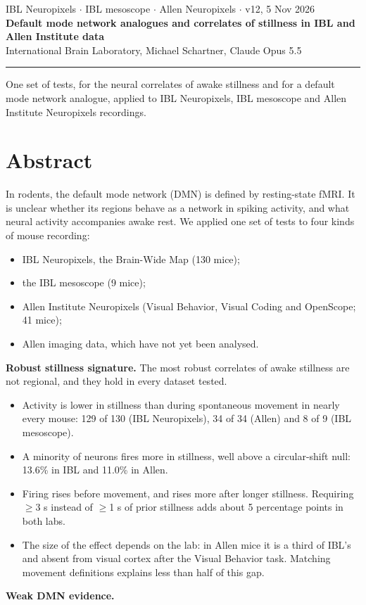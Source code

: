 \documentclass[10pt,a4paper]{article}
\begin{document}
{\small\color{muted} IBL Neuropixels $\cdot$ IBL mesoscope $\cdot$ Allen Neuropixels $\cdot$ v12, 5 Nov 2026}\\[4pt]
{\LARGE\bfseries Default mode network analogues and correlates of stillness in IBL and Allen Institute data}\\[4pt]
{\normalsize International Brain Laboratory, Michael Schartner, Claude Opus 5.5}\\[2pt]
{\color{accent}\rule{\linewidth}{1.2pt}}

One set of tests, for the neural correlates of awake stillness and for a default mode network analogue, applied to IBL Neuropixels, IBL mesoscope and Allen Institute Neuropixels recordings.

\section{Abstract}
In rodents, the default mode network (DMN) is defined by resting-state fMRI. It is unclear whether its regions behave as a network in spiking activity, and what neural activity accompanies awake rest. We applied one set of tests to four kinds of mouse recording:

\begin{itemize}
\item IBL Neuropixels, the Brain-Wide Map (130 mice);
\item the IBL mesoscope (9 mice);
\item Allen Institute Neuropixels (Visual Behavior, Visual Coding and OpenScope; 41 mice);
\item Allen imaging data, which have not yet been analysed.
\end{itemize}
\textbf{Robust stillness signature.} The most robust correlates of awake stillness are not regional, and they hold in every dataset tested.

\begin{itemize}
\item Activity is lower in stillness than during spontaneous movement in nearly every mouse: 129 of 130 (IBL Neuropixels), 34 of 34 (Allen) and 8 of 9 (IBL mesoscope).
\item A minority of neurons fires more in stillness, well above a circular-shift null: 13.6\% in IBL and 11.0\% in Allen.
\item Firing rises before movement, and rises more after longer stillness. Requiring $\geq$3 s instead of $\geq$1 s of prior stillness adds about 5 percentage points in both labs.
\item The size of the effect depends on the lab: in Allen mice it is a third of IBL's and absent from visual cortex after the Visual Behavior task. Matching movement definitions explains less than half of this gap.
\end{itemize}
\textbf{Weak DMN evidence.}
\end{document}
